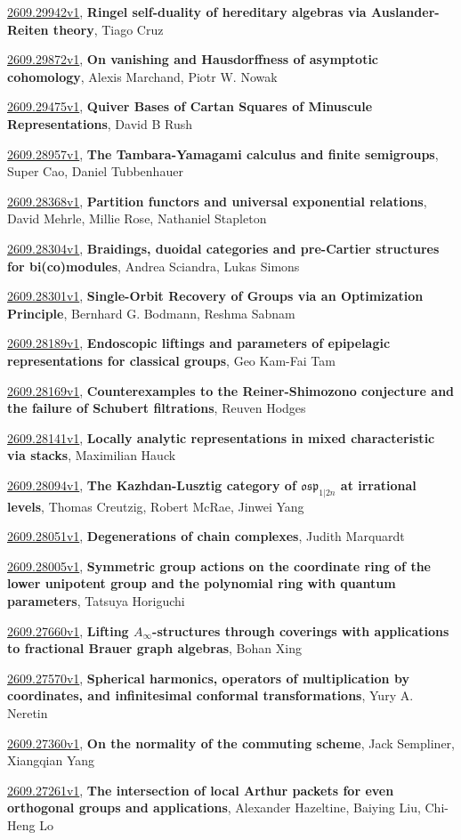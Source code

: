\documentclass[9pt, a4paper]{article}
\theoremstyle{plain}
\theoremstyle{definition}
\theoremstyle{remark}
\newcommand{\arxiv}[3]{\href{https://arxiv.org/abs/#1}{#1}, \textbf{\textcolor{arxivblue}{#2}}, #3}
\begin{document}
\arxiv{2609.29942v1}{Ringel self-duality of hereditary algebras via Auslander-Reiten theory}{Tiago Cruz}

\arxiv{2609.29872v1}{On vanishing and Hausdorffness of asymptotic cohomology}{Alexis Marchand, Piotr W. Nowak}

\arxiv{2609.29475v1}{Quiver Bases of Cartan Squares of Minuscule Representations}{David B Rush}

\arxiv{2609.28957v1}{The Tambara-Yamagami calculus and finite semigroups}{Super Cao, Daniel Tubbenhauer}

\arxiv{2609.28368v1}{Partition functors and universal exponential relations}{David Mehrle, Millie Rose, Nathaniel Stapleton}

\arxiv{2609.28304v1}{Braidings, duoidal categories and pre-Cartier structures for bi(co)modules}{Andrea Sciandra, Lukas Simons}

\arxiv{2609.28301v1}{Single-Orbit Recovery of Groups via an Optimization Principle}{Bernhard G. Bodmann, Reshma Sabnam}

\arxiv{2609.28189v1}{Endoscopic liftings and parameters of epipelagic representations for classical groups}{Geo Kam-Fai Tam}

\arxiv{2609.28169v1}{Counterexamples to the Reiner-Shimozono conjecture and the failure of Schubert filtrations}{Reuven Hodges}

\arxiv{2609.28141v1}{Locally analytic representations in mixed characteristic via stacks}{Maximilian Hauck}

\arxiv{2609.28094v1}{The Kazhdan-Lusztig category of $\mathfrak{osp}_{1|2n}$ at irrational levels}{Thomas Creutzig, Robert McRae, Jinwei Yang}

\arxiv{2609.28051v1}{Degenerations of chain complexes}{Judith Marquardt}

\arxiv{2609.28005v1}{Symmetric group actions on the coordinate ring of the lower unipotent group and the polynomial ring with quantum parameters}{Tatsuya Horiguchi}

\arxiv{2609.27660v1}{Lifting $A_\infty$-structures through coverings with applications to fractional Brauer graph algebras}{Bohan Xing}

\arxiv{2609.27570v1}{Spherical harmonics, operators of multiplication by coordinates, and infinitesimal conformal transformations}{Yury A. Neretin}

\arxiv{2609.27360v1}{On the normality of the commuting scheme}{Jack Sempliner, Xiangqian Yang}

\arxiv{2609.27261v1}{The intersection of local Arthur packets for even orthogonal groups and applications}{Alexander Hazeltine, Baiying Liu, Chi-Heng Lo}
\end{document}
